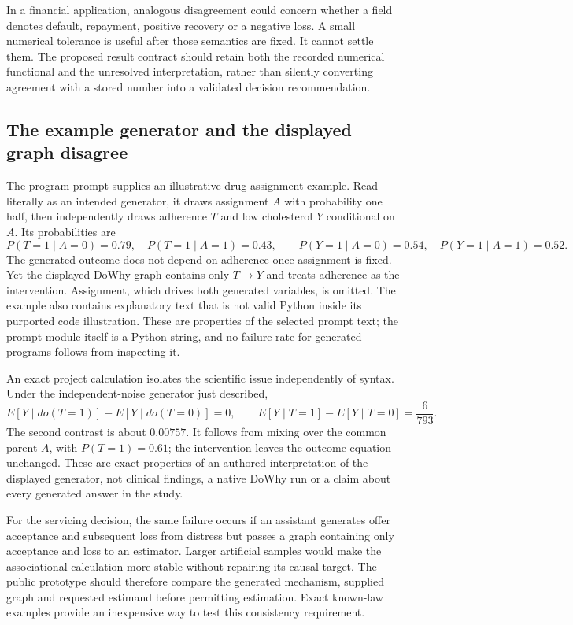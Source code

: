 In a financial application, analogous disagreement could concern whether a
field denotes default, repayment, positive recovery or a negative loss. A small
numerical tolerance is useful after those semantics are fixed. It cannot settle
them. The proposed result contract should retain both the recorded numerical
functional and the unresolved interpretation, rather than silently converting
agreement with a stored number into a validated decision recommendation.

\subsection{The example generator and the displayed graph disagree}
\label{exec21:prophetsrepo-generator}
The program prompt supplies an illustrative drug-assignment example. Read
literally as an intended generator, it draws assignment $A$ with probability
one half, then independently draws adherence $T$ and low cholesterol $Y$
conditional on $A$. Its probabilities are
\[
 P(T=1\mid A=0)=0.79,\quad P(T=1\mid A=1)=0.43,
 \qquad
 P(Y=1\mid A=0)=0.54,\quad P(Y=1\mid A=1)=0.52.
\]
The generated outcome does not depend on adherence once assignment is fixed.
Yet the displayed DoWhy graph contains only $T\to Y$ and treats adherence as
the intervention. Assignment, which drives both generated variables, is omitted.
The example also contains explanatory text that is not valid Python inside
its purported code illustration. These are properties of the selected prompt
text; the prompt module itself is a Python string, and no failure rate for
generated programs follows from inspecting it.\citep{exec21_prophets_repo}

An exact project calculation isolates the scientific issue independently of
syntax. Under the independent-noise generator just described,
\begin{equation}
 E[Y\mid do(T=1)]-E[Y\mid do(T=0)]=0,
 \qquad
 E[Y\mid T=1]-E[Y\mid T=0]=\frac{6}{793}.
 \label{exec21:prophetsrepo-confounding}
\end{equation}
The second contrast is about $0.00757$. It follows from mixing over the common
parent $A$, with $P(T=1)=0.61$; the intervention leaves the outcome equation
unchanged. These are exact properties of an authored interpretation of the
displayed generator, not clinical findings, a native DoWhy run or a claim about
every generated answer in the study.\citep{exec21_prophets_repo_reference}

For the servicing decision, the same failure occurs if an assistant generates
offer acceptance and subsequent loss from distress but passes a graph containing
only acceptance and loss to an estimator. Larger artificial samples would make
the associational calculation more stable without repairing its causal target.
The public prototype should therefore compare the generated mechanism, supplied
graph and requested estimand before permitting estimation. Exact known-law
examples provide an inexpensive way to test this consistency requirement.

